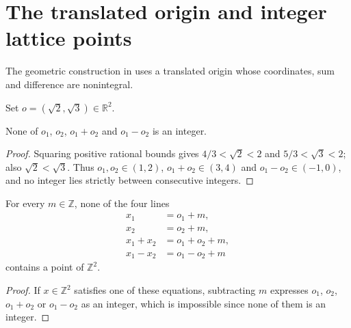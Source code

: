 \section{The translated origin and integer lattice points}
\label{sec:area_law_dyadic_origin}

The geometric construction in \cite[Section~11]{OpenAI2026AreaLaw}
uses a translated origin whose coordinates, sum and difference are
nonintegral.


\begin{definition}
    \label{def:area_law_dyadic_origin}
    \leanok
    Set $o=(\sqrt 2,\sqrt 3)\in\mathbb R^2$.
\end{definition}

\begin{lemma}
    \label{thm:area_law_dyadic_origin_nonintegral}
    \leanok
    None of $o_1$, $o_2$, $o_1+o_2$ and $o_1-o_2$ is an integer.
\end{lemma}
\begin{proof}\leanok
    Squaring positive rational bounds gives
    $4/3<\sqrt 2<2$ and $5/3<\sqrt 3<2$; also
    $\sqrt 2<\sqrt 3$. Thus $o_1,o_2\in(1,2)$,
    $o_1+o_2\in(3,4)$ and $o_1-o_2\in(-1,0)$,
    and no integer lies strictly between consecutive integers.
\end{proof}

\begin{lemma}
    \label{thm:area_law_dyadic_origin_lines}
    \leanok
    For every $m\in\mathbb Z$, none of the four lines
    \begin{align}
        x_1     & =o_1+m,     \\
        x_2     & =o_2+m,     \\
        x_1+x_2 & =o_1+o_2+m, \\
        x_1-x_2 & =o_1-o_2+m
    \end{align}
    contains a point of $\mathbb Z^2$.
\end{lemma}
\begin{proof}\leanok
    If $x\in\mathbb Z^2$ satisfies one of these equations, subtracting
    $m$ expresses $o_1$, $o_2$, $o_1+o_2$ or $o_1-o_2$ as an integer,
    which is impossible since none of them is an integer.
\end{proof}
